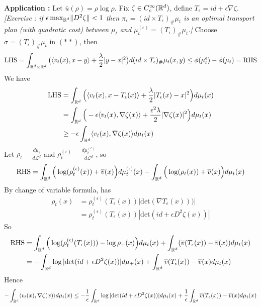 \documentclass[12pt,a4paper]{article}
\begin{document}
\textbf{Application :} Let $\bar{u}(\rho) =\rho\log \rho$. Fix $\zeta \in C_c^{\infty}(\mathbb{R}^d)$, define $T_{\epsilon} = id + \epsilon \nabla \zeta$. \emph{[Exercise : if $\epsilon \max_{\reals^d} \snorms{D^2 \zeta}{} < 1$ then $\pi_{\epsilon} = (id \times T_{\epsilon})_{\#} \mu_t$ is an optimal transport plan (with quadratic cost) between $\mu_t$ and $\mu_t^{(\epsilon)} =(T_{\epsilon})_{\#} \mu_t$.]} Choose $\sigma =(T_{\epsilon})_{\#} \mu_t$ in $(**)$, then
\begin{align*}
\text{LHS} = \int_{\mathbb{R}^d \times \mathbb{R}^d} \big( \langle v_t(x), x-y \rangle + \frac{\lambda}{2}|y-x|^2 \big) d(id\times T_{\epsilon})_{\#} \mu_t(x,y) \leq \phi(\mu_t^{\epsilon}) - \phi(\mu_t) =\text{RHS}
\end{align*}
We have
\begin{align*}
\text{LHS} &=\int_{\mathbb{R}^d} \Big( \langle v_t(x), x-T_{\epsilon}(x) \rangle + \frac{\lambda}{2}|T_{\epsilon}(x) -x|^2 \Big) d\mu_t(x) \\
&= \int_{\mathbb{R}^d} \Big( -\epsilon \langle v_t(x), \nabla \zeta(x) \rangle + \frac{\epsilon^2 \lambda}{2} |\nabla \zeta(x)|^2 \Big) d\mu_t(x) \\
& \geq -\epsilon \int_{\mathbb{R}^d} \langle v_t(x) , \nabla \zeta(x) \rangle d\mu_t(x)
\end{align*}
Let $\rho_t = \frac{d\mu_t}{d \mathscr{L}^d}$ and $\rho_t^{(\epsilon)} = \frac{d\mu_t^{(\epsilon)}}{d \mathscr{L}^d}$, so
\begin{align*}
\text{RHS} = \int_{\mathbb{R}^d} \Big( \log (\rho_t^{(\epsilon)}(x)) + \overline{v}(x) \Big) d\mu_t^{(\epsilon)}(x) - \int_{\mathbb{R}^d} \Big( \log (\rho_t(x)) + \overline{v}(x) \Big) d\mu_t(x)
\end{align*}
By change of variable formula, has
\begin{align*}
\rho_t(x) &= \rho^{(\epsilon)}_t(T_{\epsilon}(x)) |\text{det}(\nabla T_{\epsilon}(x)))| \\
&= \rho_t^{(\epsilon)}(T_{\epsilon}(x)) |\text{det}(id + \epsilon D^2 \zeta(x))|
\end{align*}
So
\begin{align*}
\text{RHS} &= \int_{\mathbb{R}^d} \Big( \log(\rho_t^{(\epsilon)}(T_{\epsilon}(x)))-\log \rho_+(x) \Big) d\mu_t(x) + \int_{\mathbb{R}^d} (\overline{v}(T_{\epsilon}(x))- \overline{v}(x)) d\mu_t(x) \\
&= -\int_{\mathbb{R}^d} \log |\text{det}(id + \epsilon D^2 \zeta(x))| d\mu_+(x) + \int_{\mathbb{R}^d} \overline{v}(T_{\epsilon}(x)) - \overline{v}(x) d\mu_t(x)
\end{align*}
Hence
\begin{align*}
- \int_{\mathbb{R}^d} \langle v_t(x), \nabla \zeta(x) \rangle d\mu_t(x) \leq - \frac{1}{\epsilon}\int_{\mathbb{R}^d} \log |\text{det}(id + \epsilon D^2 \zeta(x))| d\mu_t(x) + \frac{1}{\epsilon}\int_{\mathbb{R}^d} \overline{v}(T_{\epsilon}(x)) - \overline{v}(x) d\mu_t(x)
\end{align*}
\end{document}
